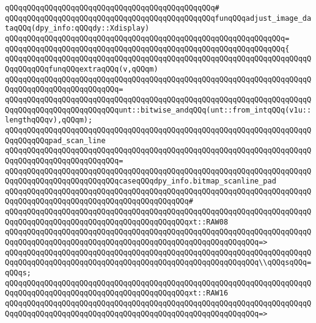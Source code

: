 \verb|qQQqqQQqqQQqqQQqqQQqqQQqqQQqqQQqqQQqqQQqqQQqqQQq#|\newline
\verb|qQQqqQQqqQQqqQQqqQQqqQQqqQQqqQQqqQQqqQQqqQQqqQQqfunqQQqadjust_image_dataqQQq(dpy_info:qQQqdy::Xdisplay)|\newline
\verb|qQQqqQQqqQQqqQQqqQQqqQQqqQQqqQQqqQQqqQQqqQQqqQQqqQQqqQQqqQQqqQQq=|\newline
\verb|qQQqqQQqqQQqqQQqqQQqqQQqqQQqqQQqqQQqqQQqqQQqqQQqqQQqqQQqqQQqqQQq{|\newline
\verb|qQQqqQQqqQQqqQQqqQQqqQQqqQQqqQQqqQQqqQQqqQQqqQQqqQQqqQQqqQQqqQQqqQQqqQQqqQQqqQQqfunqQQqextraqQQq(v,qQQqm)|\newline
\verb|qQQqqQQqqQQqqQQqqQQqqQQqqQQqqQQqqQQqqQQqqQQqqQQqqQQqqQQqqQQqqQQqqQQqqQQqqQQqqQQqqQQqqQQqqQQqqQQq=|\newline
\verb|qQQqqQQqqQQqqQQqqQQqqQQqqQQqqQQqqQQqqQQqqQQqqQQqqQQqqQQqqQQqqQQqqQQqqQQqqQQqqQQqqQQqqQQqqQQqqQQqunt::bitwise_andqQQq(unt::from_intqQQq(v1u::lengthqQQqv),qQQqm);|\newline
\newline
\verb|qQQqqQQqqQQqqQQqqQQqqQQqqQQqqQQqqQQqqQQqqQQqqQQqqQQqqQQqqQQqqQQqqQQqqQQqqQQqqQQqpad_scan_line|\newline
\verb|qQQqqQQqqQQqqQQqqQQqqQQqqQQqqQQqqQQqqQQqqQQqqQQqqQQqqQQqqQQqqQQqqQQqqQQqqQQqqQQqqQQqqQQqqQQqqQQq=|\newline
\verb|qQQqqQQqqQQqqQQqqQQqqQQqqQQqqQQqqQQqqQQqqQQqqQQqqQQqqQQqqQQqqQQqqQQqqQQqqQQqqQQqqQQqqQQqqQQqqQQqcaseqQQqdpy_info.bitmap_scanline_pad|\newline
\verb|qQQqqQQqqQQqqQQqqQQqqQQqqQQqqQQqqQQqqQQqqQQqqQQqqQQqqQQqqQQqqQQqqQQqqQQqqQQqqQQqqQQqqQQqqQQqqQQqqQQqqQQqqQQqqQQq#|\newline
\verb|qQQqqQQqqQQqqQQqqQQqqQQqqQQqqQQqqQQqqQQqqQQqqQQqqQQqqQQqqQQqqQQqqQQqqQQqqQQqqQQqqQQqqQQqqQQqqQQqqQQqqQQqqQQqqQQqxt::RAW08|\newline
\verb|qQQqqQQqqQQqqQQqqQQqqQQqqQQqqQQqqQQqqQQqqQQqqQQqqQQqqQQqqQQqqQQqqQQqqQQqqQQqqQQqqQQqqQQqqQQqqQQqqQQqqQQqqQQqqQQqqQQqqQQqqQQqqQQq=>|\newline
\verb|qQQqqQQqqQQqqQQqqQQqqQQqqQQqqQQqqQQqqQQqqQQqqQQqqQQqqQQqqQQqqQQqqQQqqQQqqQQqqQQqqQQqqQQqqQQqqQQqqQQqqQQqqQQqqQQqqQQqqQQqqQQqqQQq\\qQQqsqQQq=qQQqs;|\newline
\newline
\verb|qQQqqQQqqQQqqQQqqQQqqQQqqQQqqQQqqQQqqQQqqQQqqQQqqQQqqQQqqQQqqQQqqQQqqQQqqQQqqQQqqQQqqQQqqQQqqQQqqQQqqQQqqQQqqQQqxt::RAW16|\newline
\verb|qQQqqQQqqQQqqQQqqQQqqQQqqQQqqQQqqQQqqQQqqQQqqQQqqQQqqQQqqQQqqQQqqQQqqQQqqQQqqQQqqQQqqQQqqQQqqQQqqQQqqQQqqQQqqQQqqQQqqQQqqQQqqQQq=>|\newline
